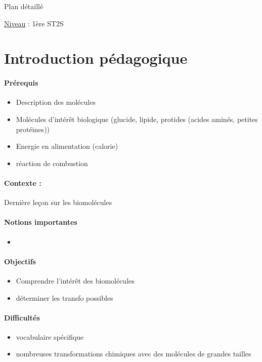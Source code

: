 \begin{reportBlock}{Plan détaillé}

\underline{Niveau} : 1ère ST2S \\

\section*{Introduction pédagogique}


\paragraph*{Prérequis}
\begin{itemize}
\item Description des molécules
\item Molécules d'intérêt biologique (glucide, lipide, protides (acides aminés, petites protéines))
\item Energie en alimentation (calorie)
\item réaction de combustion
\end{itemize}
\paragraph*{Contexte :}
Dernière leçon sur les biomolécules

\paragraph*{Notions importantes}

\begin{itemize}
\item 
\end{itemize}

\paragraph*{Objectifs}

\begin{itemize}
\item Comprendre l'intérêt des biomolécules
\item déterminer les transfo possibles
\end{itemize}

\paragraph*{Difficultés}

\begin{itemize}
\item vocabulaire spécifique
\item nombreuses transformations chimiques avec des molécules de grandes tailles
\end{itemize}


\end{reportBlock}
